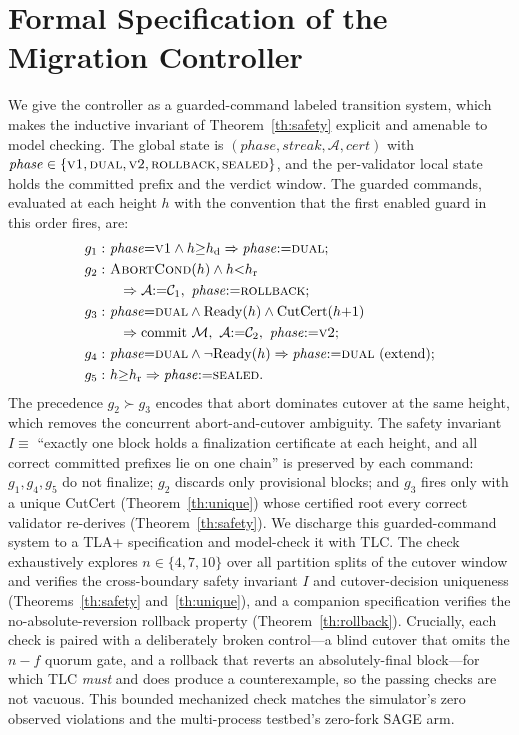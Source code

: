 \documentclass[journal]{IEEEtran}
\theoremstyle{remark}
\begin{document}
\appendices

\section{Formal Specification of the Migration Controller}
\label{app:spec}
We give the controller as a guarded-command labeled transition system, which makes the
inductive invariant of Theorem~\ref{th:safety} explicit and amenable to model checking. The
global state is $(\mathit{phase}, \mathit{streak}, \mathcal{A}, \mathit{cert})$ with
$\mathit{phase}\in\{\textsc{v1},\textsc{dual},\textsc{v2},\textsc{rollback},\textsc{sealed}\}$,
and the per-validator local state holds the committed prefix and the verdict window. The
guarded commands, evaluated at each height $h$ with the convention that the first enabled guard
in this order fires, are:
\begin{align*}
g_1:&\ \mathit{phase}{=}\textsc{v1}\wedge h{\ge}h_{\mathrm{d}} \Rightarrow \mathit{phase}{:=}\textsc{dual};\\
g_2:&\ \textsc{AbortCond}(h)\wedge h{<}h_{\mathrm{r}}\\
    &\quad \Rightarrow \mathcal{A}{:=}\mathcal{C}_1,\ \mathit{phase}{:=}\textsc{rollback};\\
g_3:&\ \mathit{phase}{=}\textsc{dual}\wedge\mathrm{Ready}(h)\wedge\mathrm{CutCert}(h{+}1)\\
    &\quad \Rightarrow \text{commit }\mathcal{M},\ \mathcal{A}{:=}\mathcal{C}_2,\ \mathit{phase}{:=}\textsc{v2};\\
g_4:&\ \mathit{phase}{=}\textsc{dual}\wedge\neg\mathrm{Ready}(h) \Rightarrow \mathit{phase}{:=}\textsc{dual}\ (\text{extend});\\
g_5:&\ h{\ge}h_{\mathrm{r}} \Rightarrow \mathit{phase}{:=}\textsc{sealed}.
\end{align*}
The precedence $g_2 \succ g_3$ encodes that abort dominates cutover at the same height, which
removes the concurrent abort-and-cutover ambiguity. The safety invariant
$I \equiv$ ``exactly one block holds a finalization certificate at each height, and all correct
committed prefixes lie on one chain'' is preserved by each command: $g_1,g_4,g_5$ do not
finalize; $g_2$ discards only provisional blocks; and $g_3$ fires only with a unique CutCert
(Theorem~\ref{th:unique}) whose certified root every correct validator re-derives
(Theorem~\ref{th:safety}). We discharge this guarded-command system to a TLA+ specification and
model-check it with TLC. The check exhaustively explores $n\in\{4,7,10\}$ over all partition splits of the
cutover window and verifies the cross-boundary safety invariant $I$ and cutover-decision
uniqueness (Theorems~\ref{th:safety} and~\ref{th:unique}), and a companion specification verifies
the no-absolute-reversion rollback property (Theorem~\ref{th:rollback}). Crucially, each check is
paired with a deliberately broken control---a blind cutover that omits the $n-f$ quorum gate, and
a rollback that reverts an absolutely-final block---for which TLC \emph{must} and does produce a
counterexample, so the passing checks are not vacuous. This bounded mechanized check matches the
simulator's zero observed violations and the multi-process testbed's zero-fork SAGE arm.
\end{document}
